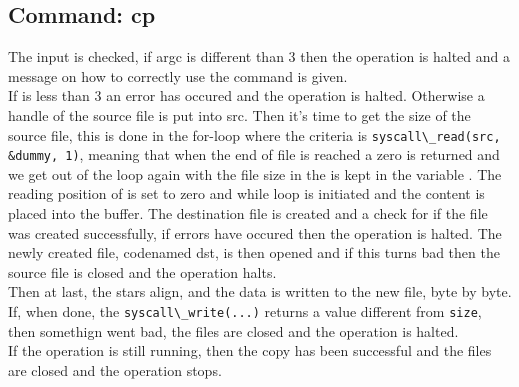 \subsection{Command: cp}
The input is checked, if argc is different than 3 then the operation is halted
and a message on how to correctly use the command is given.\\
If  is less than 3 an error has occured and the
operation is halted. Otherwise a handle of the source file is put into src.
Then
it's time to get the size of the source file, this is done in the for-loop where
the criteria is \verb|syscall\_read(src, &dummy, 1)|, meaning that when the end
of file is reached a zero is returned and we get out of the loop again with the
file size in the is kept in the variable .
The reading position of
 is set to zero and while loop is initiated and the content is placed
into the buffer.
The destination file is created and a check for if the file was created
successfully, if errors have occured then the operation is halted.
The newly created file, codenamed dst, is then opened and if this turns bad then
the source file is closed and the operation halts.\\
Then at last, the stars align, and the data is written to the new file, byte by
byte. If, when done, the \verb|syscall\_write(...)| returns a value different
from \verb|size|, then somethign went bad, the files are closed and the
operation is halted.\\
If the operation is still running, then the copy has been successful and the
files are closed and the operation stops.

